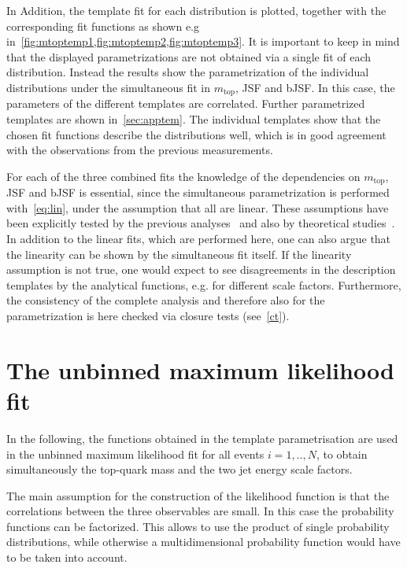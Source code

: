 In Addition, the template fit for each distribution is plotted, together with the corresponding fit functions as shown e.g in~\cref{fig:mtoptemp1,fig:mtoptemp2,fig:mtoptemp3}. It is important to keep in mind that the displayed parametrizations are not obtained via a single fit of each distribution. Instead the results show the parametrization of the individual distributions under the simultaneous fit in $m_{\text{top}}$, JSF and bJSF. In this case, the parameters of the different templates are correlated. Further parametrized templates are shown in~\cref{sec:apptem}. The individual templates show that the chosen fit functions describe the distributions well, which is in good agreement with the observations from the previous measurements.

For each of the three combined fits the knowledge of the dependencies on $m_{\text{top}}$, JSF and bJSF is essential, since the simultaneous parametrization is performed with~\cref{eq:lin}, under the assumption that all  are linear. 
These assumptions have been explicitly tested by the previous analyses~\cite{Aad:2015nba,ATLAS-CONF-2017-071}  and also by theoretical studies~\cite{Heinrich:2017bqp}. In addition to the linear fits, which are performed here, one can also argue that the linearity can be shown by the simultaneous fit itself.  If the linearity assumption is not true, one would expect to see disagreements in the description  templates by the analytical functions, e.g. for different scale factors. Furthermore, the consistency of the complete analysis and therefore also for the parametrization is here checked via closure tests (see~\cref{ct}).




 
 




\section{The unbinned maximum likelihood fit}

In the following, the functions obtained in the template parametrisation are used in the unbinned maximum likelihood fit
for all events $i = 1,..,N$, to obtain simultaneously the top-quark mass and the two jet energy scale factors. 
 
 The main assumption for the construction of the likelihood function is that the correlations between the three observables are small. In this case the probability  functions can be factorized. This allows to use the product of single probability distributions, while otherwise a multidimensional probability function would have to be taken into account.



